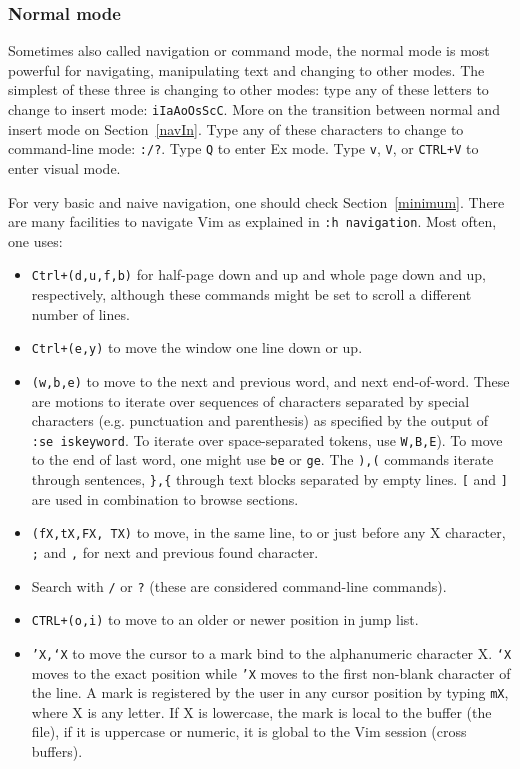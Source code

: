 \documentclass{article}
\newcommand{\tttt}[1]{\texttt{#1}}
\begin{document}
\subsubsection{Normal mode}\label{normal}
Sometimes also called navigation or command mode,
the normal mode is most powerful for
navigating, manipulating text and changing to other modes.
The simplest of these three is changing to other modes:
type any of these letters to change to insert mode:
\texttt{iIaAoOsScC}. More on the transition between
normal and insert mode on Section~\ref{navIn}.
Type any of these characters to change to command-line mode:
\texttt{:/?}.
Type \texttt{Q} to enter Ex mode.
Type \texttt{v}, \texttt{V}, or \texttt{CTRL+V} to enter visual mode.

For very basic and naive navigation, one should check Section~\ref{minimum}.
There are many facilities to navigate Vim
as explained in \texttt{:h navigation}.
Most often, one uses:
\begin{itemize}
  \item \texttt{Ctrl+(d,u,f,b)} for half-page down and up
and whole page down and up, respectively, although these commands might
be set to scroll a different number of lines.
  \item \texttt{Ctrl+(e,y)} to move the window one line down or up.
  \item \texttt{(w,b,e)} to move to the next and previous word,
    and next end-of-word.
    These are motions to iterate over sequences of characters separated
    by special characters (e.g. punctuation and parenthesis) as
    specified by the output of \texttt{:se iskeyword}.
    To iterate over space-separated tokens, use \texttt{W,B,E}).
    To move to the end of last word, one might use \texttt{be}
    or \texttt{ge}.
The \texttt{),(} commands iterate through sentences,
		\tttt{\},\{} through text blocks separated by empty lines.
    \tttt{[} and \tttt{]} are used in combination to browse sections.
  \item \texttt{(fX,tX,FX, TX)} to move, in the same line, to or just before any X character,
	  \tttt{;} and \tttt{,} for next and previous found character.
  \item Search with \tttt{/} or \tttt{?} (these are considered command-line commands).
  \item \texttt{CTRL+(o,i)} to move to an older or newer position in
    jump list.
  \item \texttt{'X,`X} to move the cursor to a mark bind to the alphanumeric character X.
    \texttt{`X} moves to the exact position while \texttt{'X} moves to
    the first non-blank character of the line.
    A mark is registered by the user in any cursor position
    by typing \texttt{mX}, where X is any letter.
    If X is lowercase, the mark is local to the buffer (the file),
    if it is uppercase or numeric, it is global to the Vim session
    (cross buffers).
\end{itemize}
\end{document}
